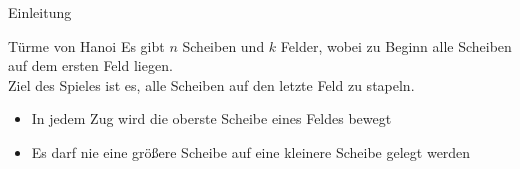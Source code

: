 \begin{frame}{Einleitung}
    \begin{block}{Türme von Hanoi}
    Es gibt $n$ Scheiben und $k$ Felder, wobei zu Beginn alle Scheiben auf dem ersten Feld liegen.\\
    Ziel des Spieles ist es, alle Scheiben auf den letzte Feld zu stapeln.
    \begin{itemize}
        \item In jedem Zug wird die oberste Scheibe eines Feldes bewegt
        \item Es darf nie eine größere Scheibe auf eine kleinere Scheibe gelegt werden
    \end{itemize}
    \end{block}
\end{frame}